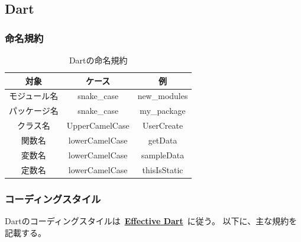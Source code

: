 \subsection{Dart}
\subsubsection{命名規約}
\begin{table}[H]
  \centering
  \caption{Dartの命名規約}
  \label{tab:code-dart}
  \begin{tabular}{|c|c|c|} \hline
    対象     & ケース                & 例                \\ \hline \hline
    モジュール名 & snake\_case        & new\_modules \\ \hline
    パッケージ名 & snake\_case        & my\_package      \\ \hline
    クラス名   & UpperCamelCase     & UserCreate       \\ \hline
    関数名    & lowerCamelCase        & getData     \\ \hline
    変数名    & lowerCamelCase        & sampleData       \\ \hline
    定数名    & lowerCamelCase & thisIsStatic \\ \hline
  \end{tabular}
\end{table}

\subsubsection{コーディングスタイル}
Dartのコーディングスタイルは~\href{https://dart.dev/effective-dart/style}{\textbf{Effective Dart}}~に従う。
以下に、主な規約を記載する。

